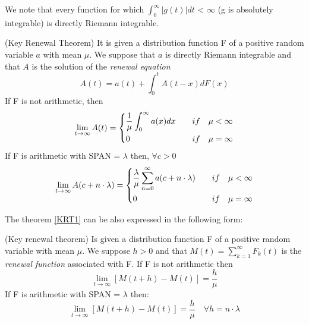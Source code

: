 We note that every function for which $\int_{0}^{\infty} |g(t)| dt$ < $\infty$ (g is absolutely integrable) is directly Riemann integrable.

\begin{theorem}
	(Key Renewal Theorem) It is given a distribution function F of a positive random variable $a$ with mean $\mu$. We suppose that $a$ is directly Riemann integrable and that $A$ is the solution of the \textit{renewal equation}
	\begin{equation}
		A(t)=a(t)+\int_{0}^{t}A(t-x)dF(x)
	\end{equation}
	If F is not arithmetic, then
	\begin{equation*}
		\lim_{t \rightarrow \infty} A(t) =
		\begin{dcases}
			\frac{1}{\mu} \int_{0}^{\infty}a(x)dx \quad & if \quad \mu < \infty \\
			0 \quad & if \quad \mu = \infty
		\end{dcases}
	\end{equation*}
	If F is arithmetic with SPAN = $\lambda$ then, $\forall c > 0$
	\begin{equation*}
		\lim_{t \rightarrow \infty} A(c+n\cdot \lambda) =
		\begin{dcases}
			\frac{\lambda}{\mu} \sum_{n=0}^{\infty}a(c+n \cdot \lambda) \quad & if 	\quad \mu<\infty \\
			0 \quad & if \quad \mu = \infty
		\end{dcases}
	\end{equation*}
\label{KRT1}
\end{theorem}

The theorem \ref{KRT1} can be also expressed in the following form:

\begin{theorem}
	(Key renewal theorem) Is given a distribution function F of a positive random variable with mean $\mu$. We suppose $h>0$ and that $M(t)=\sum_{k=1}^\infty F_{k}(t)$ is the \textit{renewal function} associated with F.
	If F is not arithmetic then
	\begin{equation}
		\lim_{t \rightarrow \infty} [M(t+h)-M(t)]=\frac{h}{\mu}
	\end{equation}
	If F is arithmetic with SPAN = $\lambda$ then:
	\begin{equation}
		\lim_{t \rightarrow \infty} [M(t+h)-M(t)]=\frac{h}{\mu} \quad \forall h = n \cdot \lambda
	\end{equation}
	\label{KRT2}
\end{theorem}

